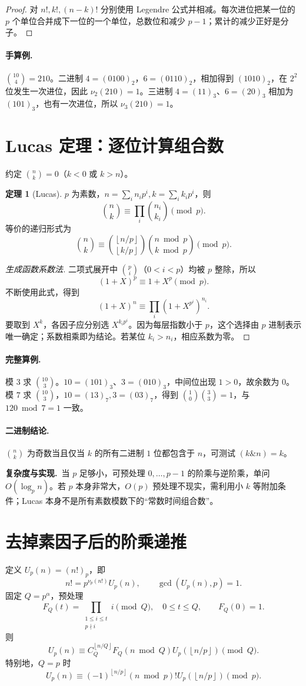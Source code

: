 \documentclass[UTF8,a4paper,11pt,oneside,openany,fontset=fandol]{ctexbook}
\theoremstyle{definition}
\newtheorem{theorem}[definition]{定理}
\newcommand{\floor}[1]{\left\lfloor #1\right\rfloor}
\newcommand{\cost}{\par\noindent\textbf{复杂度与实现.}\ }
\begin{document}
\begin{proof}
对 $n!,k!,(n-k)!$ 分别使用 Legendre 公式并相减。每次进位把某一位的 $p$ 个单位合并成下一位的一个单位，总数位和减少 $p-1$；累计的减少正好是分子。
\end{proof}
\paragraph{手算例.} $\binom{10}{4}=210$。二进制 $4=(0100)_2$，$6=(0110)_2$，相加得到 $(1010)_2$，在 $2^2$ 位发生一次进位，因此 $\nu_2(210)=1$。三进制 $4=(11)_3$、$6=(20)_3$ 相加为 $(101)_3$，也有一次进位，所以 $\nu_3(210)=1$。


\section{Lucas 定理：逐位计算组合数}
约定 $\binom nk=0$（$k<0$ 或 $k>n$）。
\begin{theorem}[Lucas]
$p$ 为素数，$n=\sum_i n_ip^i,k=\sum_i k_ip^i$，则
\[
 \binom nk\equiv\prod_i\binom{n_i}{k_i}\pmod p.
\]
等价的递归形式为
\[
 \binom nk\equiv\binom{\floor{n/p}}{\floor{k/p}}
 \binom{n\bmod p}{k\bmod p}\pmod p.
\]
\end{theorem}

\begin{proof}[生成函数系数法]
二项式展开中 $\binom pi$（$0<i<p$）均被 $p$ 整除，所以
\[
(1+X)^p\equiv1+X^p\pmod p.
\]
不断使用此式，得到
\[
 (1+X)^n\equiv\prod_i(1+X^{p^i})^{n_i}.
\]
要取到 $X^k$，各因子应分别选 $X^{k_ip^i}$。因为每层指数小于 $p$，这个选择由 $p$ 进制表示唯一确定；系数相乘即为结论。若某位 $k_i>n_i$，相应系数为零。
\end{proof}
\paragraph{完整算例.} 模 $3$ 求 $\binom{10}{3}$。$10=(101)_3$、$3=(010)_3$，中间位出现 $1>0$，故余数为 $0$。模 $7$ 求 $\binom{10}{3}$，$10=(13)_7,3=(03)_7$，得到 $\binom10\binom33=1$，与 $120\bmod7=1$ 一致。
\paragraph{二进制结论.} $\binom nk$ 为奇数当且仅当 $k$ 的所有二进制 $1$ 位都包含于 $n$，可测试 $(k\mathbin{\&}n)=k$。
\cost 当 $p$ 足够小，可预处理 $0,\ldots,p-1$ 的阶乘与逆阶乘，单问 $O(\log_p n)$。若 $p$ 本身非常大，$O(p)$ 预处理不现实，需利用小 $k$ 等附加条件；Lucas 本身不是所有素数模数下的“常数时间组合数”。


\section{去掉素因子后的阶乘递推}
定义 $U_p(n)=(n!)_p$，即
\[
 n!=p^{\nu_p(n!)}U_p(n),\qquad\gcd(U_p(n),p)=1.
\]
固定 $Q=p^\alpha$，预处理
\[
 F_Q(t)=\prod_{\substack{1\le i\le t\\p\nmid i}}i\pmod Q,\quad0\le t\le Q,\qquad F_Q(0)=1.
\]
则
\[
 U_p(n)\equiv C_Q^{\floor{n/Q}}F_Q(n\bmod Q)
 U_p(\floor{n/p})\pmod Q.
\]
特别地，$Q=p$ 时
\[
 U_p(n)\equiv(-1)^{\floor{n/p}}(n\bmod p)!
 U_p(\floor{n/p})\pmod p.
\]
\end{document}
